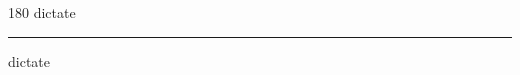 
\begin{frame}
\begin{center}
\begin{turn}{180}
{\fontsize{2.5cm}{1em}\selectfont dictate}
\end{turn}
\vspace{1em}\par  
\hrule
\vspace{1em}\par  
{\fontsize{2.5cm}{1em}\selectfont dictate}
\end{center}
\end{frame}

